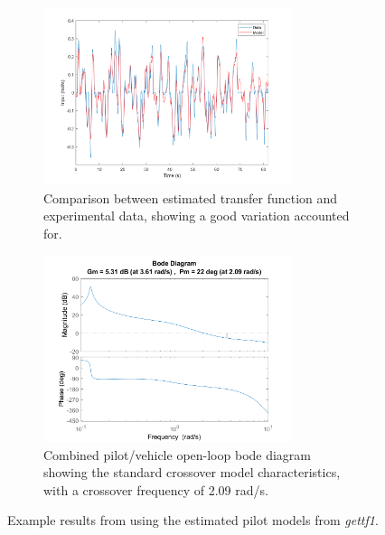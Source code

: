 \begin{figure}[p]
    \centering
    \begin{subfigure}{\textwidth}
        \centering
        \includegraphics[width=0.8\textwidth]{figures/Modeling/model_output.png}
        \caption[Comparison between estimated transfer function and experimental data]{Comparison between estimated transfer function and experimental data, showing a good variation accounted for.}
        \label{fig:comparison}
    \end{subfigure}
    \hfill
    \begin{subfigure}{\textwidth}
        \centering
        \includegraphics[width=0.8\textwidth]{figures/Modeling/YpYc_204.png}
        \caption[Combined pilot/vehicle open-loop bode diagram]{Combined pilot/vehicle open-loop bode diagram showing the standard crossover model characteristics, with a crossover frequency of 2.09 rad/s.}
        \label{fig:bode}
    \end{subfigure}
    \caption[Example results from using the estimated pilot models from \textit{gettf1}]{Example results from using the estimated pilot models from \textit{gettf1}.}
\end{figure}

